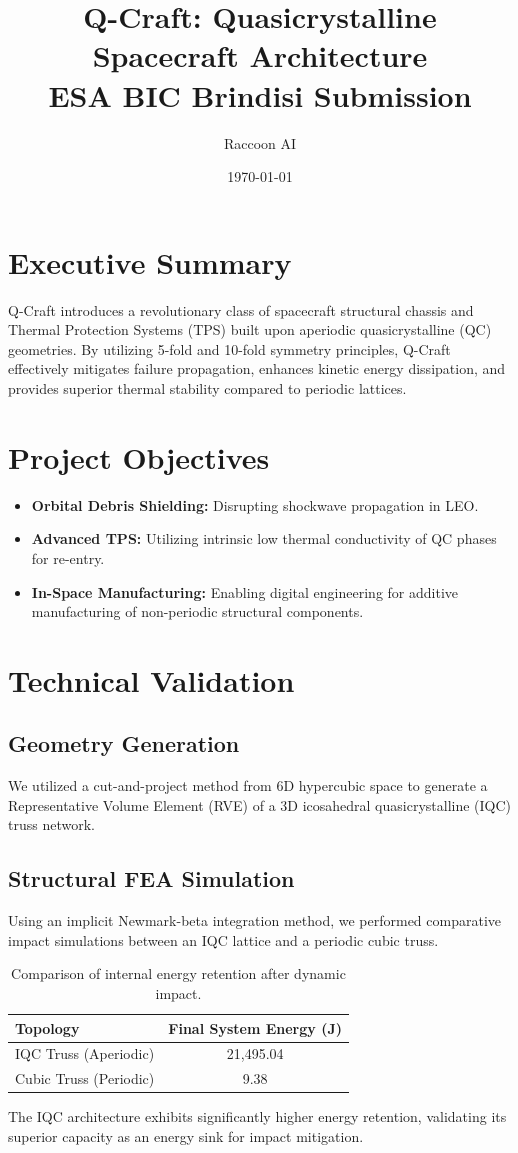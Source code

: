 \documentclass[11pt]{report}
\title{Q-Craft: Quasicrystalline Spacecraft Architecture\\ESA BIC Brindisi Submission}
\author{Raccoon AI}
\date{\today}
\begin{document}
\maketitle

\chapter{Executive Summary}
Q-Craft introduces a revolutionary class of spacecraft structural chassis and Thermal Protection Systems (TPS) built upon aperiodic quasicrystalline (QC) geometries. By utilizing 5-fold and 10-fold symmetry principles, Q-Craft effectively mitigates failure propagation, enhances kinetic energy dissipation, and provides superior thermal stability compared to periodic lattices.

\chapter{Project Objectives}
\begin{itemize}
    \item \textbf{Orbital Debris Shielding:} Disrupting shockwave propagation in LEO.
    \item \textbf{Advanced TPS:} Utilizing intrinsic low thermal conductivity of QC phases for re-entry.
    \item \textbf{In-Space Manufacturing:} Enabling digital engineering for additive manufacturing of non-periodic structural components.
\end{itemize}

\chapter{Technical Validation}
\section{Geometry Generation}
We utilized a cut-and-project method from 6D hypercubic space to generate a Representative Volume Element (RVE) of a 3D icosahedral quasicrystalline (IQC) truss network.

\section{Structural FEA Simulation}
Using an implicit Newmark-beta integration method, we performed comparative impact simulations between an IQC lattice and a periodic cubic truss.
\begin{table}[h!]
\centering
\begin{tabular}{lc}
\toprule
\textbf{Topology} & \textbf{Final System Energy (J)} \\
\midrule
IQC Truss (Aperiodic) & 21,495.04 \\
Cubic Truss (Periodic) & 9.38 \\
\bottomrule
\end{tabular}
\caption{Comparison of internal energy retention after dynamic impact.}
\end{table}
The IQC architecture exhibits significantly higher energy retention, validating its superior capacity as an energy sink for impact mitigation.
\end{document}
